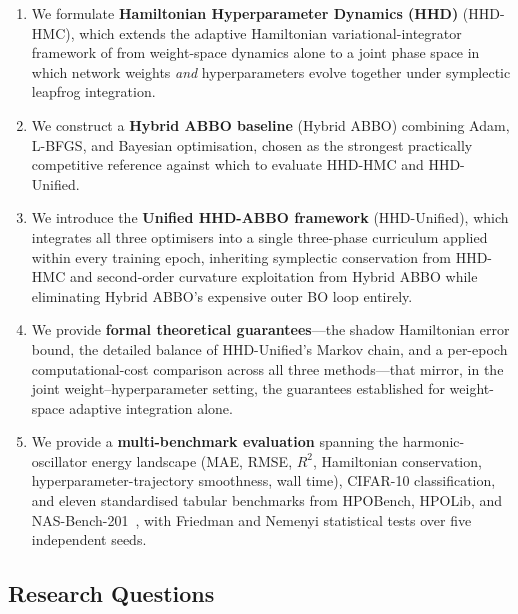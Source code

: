 \documentclass[11pt]{article}
\theoremstyle{definition}
\begin{document}
\begin{enumerate}[leftmargin=*, label=\textbf{C\arabic*.}]
\item We formulate \textbf{Hamiltonian Hyperparameter Dynamics (HHD)}
      (HHD-HMC), which extends the adaptive Hamiltonian
      variational-integrator framework of
      \cite{duruisseaux2021adaptive} from weight-space dynamics alone
      to a joint phase space in which network weights \emph{and}
      hyperparameters evolve together under symplectic leapfrog
      integration.

\item We construct a \textbf{Hybrid ABBO baseline} (Hybrid ABBO)
      combining Adam, L-BFGS, and Bayesian optimisation, chosen as
      the strongest practically competitive reference against which
      to evaluate HHD-HMC and HHD-Unified.

\item We introduce the \textbf{Unified HHD-ABBO framework}
      (HHD-Unified), which integrates all three optimisers into a
      single three-phase curriculum applied within every training
      epoch, inheriting symplectic conservation from HHD-HMC and
      second-order curvature exploitation from Hybrid ABBO while
      eliminating Hybrid ABBO's expensive outer BO loop entirely.

\item We provide \textbf{formal theoretical guarantees}---the shadow
      Hamiltonian error bound, the detailed balance of HHD-Unified's
      Markov chain, and a per-epoch computational-cost comparison
      across all three methods---that mirror, in the joint
      weight--hyperparameter setting, the guarantees
      \cite{duruisseaux2021adaptive} established for weight-space
      adaptive integration alone.

\item We provide a \textbf{multi-benchmark evaluation} spanning the
      harmonic-oscillator energy landscape (MAE, RMSE, $R^2$,
      Hamiltonian conservation, hyperparameter-trajectory smoothness,
      wall time), CIFAR-10 classification, and eleven standardised
      tabular benchmarks from HPOBench, HPOLib, and
      NAS-Bench-201~\cite{eggensperger2021,dong2020nasbench201}, with
      Friedman and Nemenyi statistical tests over five independent
      seeds.
\end{enumerate}

\subsection{Research Questions}
\end{document}
